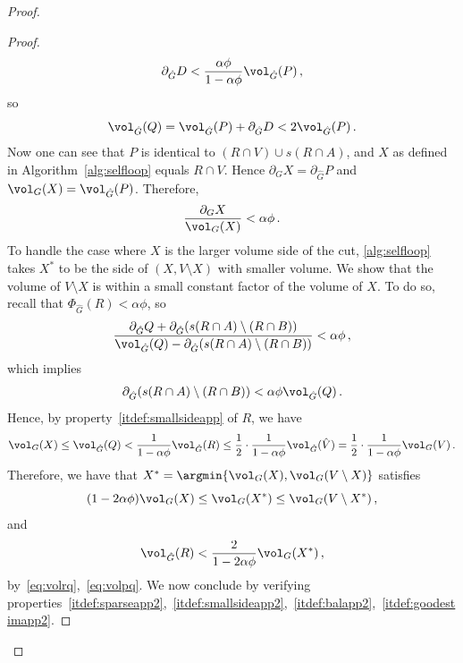 \begin{proof}
\begin{proof}
\begin{equation*}
		\partial_{\hat{G}} D < \frac{\alpha \phi}{1-\alpha\phi}\vol_{\hat{G}}(P) \, ,
	\end{equation*}
	so
	\begin{equation}
		\label{eq:volpq}
		\vol_{\hat{G}}(Q) = \vol_{\hat{G}}(P) + \partial_{\hat{G}} D < 2 \vol_{\hat{G}}(P) \, .
	\end{equation}
	Now one can see that $P$ is identical to $(R \cap V) \cup s(R \cap A)$, and $X$ as defined in Algorithm~\ref{alg:selfloop} equals $R \cap V$. Hence $\partial_G X = \partial_{\hat{G}} P$ and $\vol_G(X)=\vol_{\hat{G}}(P)$. Therefore,
	\begin{equation}
		\label{eq:smallratio}
		\frac{\partial_G X}{\vol_G (X)} < \alpha \phi \, .
	\end{equation}
	To handle the case where $X$ is the larger volume side of the cut, \cref{alg:selfloop} takes $X^*$ to be the side of $(X,V\setminus X)$ with smaller volume. We show that the volume of $V\setminus X$ is within a small constant factor of the volume of $X$. To do so, recall that $\Phi_{\hat{G}}(R)<\alpha \phi$, so
	\begin{equation*}
		\frac{\partial_{\hat{G}} Q + \partial_{\hat{G}}(s(R \cap A) \setminus (R \cap B))}{\vol_{\hat{G}}(Q) - \partial_{\hat{G}}(s(R \cap A) \setminus (R \cap B))} < \alpha \phi \,,
	\end{equation*}
	which implies
	\begin{equation*}
		\partial_{\hat{G}}(s(R \cap A) \setminus (R \cap B)) < \alpha \phi \vol_{\hat{G}}(Q) \, .
	\end{equation*}
	Hence, by property~\eqref{itdef:smallsideapp} of $R$, we have
	\begin{equation*}
		\vol_G(X) \le \vol_{\hat{G}}(Q) < \frac{1}{1-\alpha\phi}\vol_{\hat{G}}(R) \le \frac{1}{2} \cdot  \frac{1}{1-\alpha\phi} \vol_{\hat{G}}(\hat{V}) = \frac{1}{2} \cdot  \frac{1}{1-\alpha\phi}\vol_G(V) \, .
	\end{equation*}
	Therefore, we have that $X^* = \argmin\{\vol_G(X), \vol_G(V\setminus X)\}$ satisfies
	\begin{equation}
			\label{eq:nearlysamevol}
		(1-2\alpha\phi)\vol_G(X) \le \vol_G(X^*) \le \vol_G(V\setminus X^*) \, ,
	\end{equation}
	and
	\begin{equation}
		\label{eq:largevol}
		\vol_{\hat{G}}(R) < \frac{2}{1-2\alpha \phi}\vol_G(X^*) \, ,
	\end{equation}
by~\eqref{eq:volrq},~\eqref{eq:volpq}. We now conclude by verifying properties~\eqref{itdef:sparseapp2},~\eqref{itdef:smallsideapp2},~\eqref{itdef:balapp2},~\eqref{itdef:goodestimapp2}.


\end{proof}
\end{proof}
